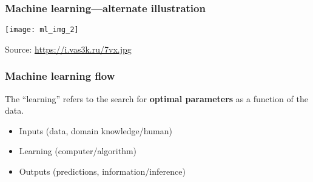 \documentclass[usenames,dvipsnames,smaller]{beamer}
\newcommand{\?}{\stackrel{?}{=}}
\begin{document}
\begin{frame}
  \frametitle{Machine learning---alternate illustration}

  \begin{center}
    \texttt{[image: ml\_img\_2]}

    {\tiny Source: \url{https://i.vas3k.ru/7vx.jpg}}
  \end{center}
\end{frame}



\begin{frame}
  \frametitle{Machine learning flow}\pause
  
  The ``learning'' refers to the search for \textbf{optimal parameters} as a function of the data.

  \pause
  
  \begin{itemize}[<+->]
  \item Inputs (data, domain knowledge/human)
  \item Learning (computer/algorithm)
  \item Outputs (predictions, information/inference)
  \end{itemize}

\end{frame}
\end{document}
